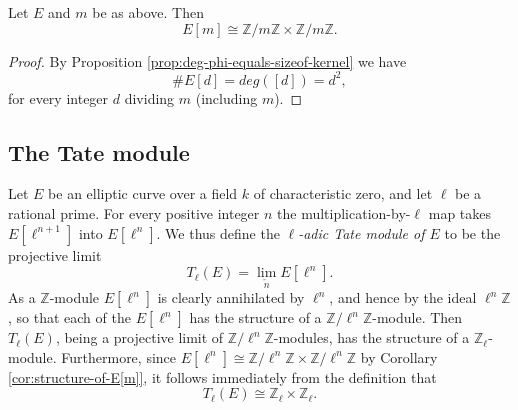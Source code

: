 \begin{cor}
  \label{cor:structure-of-E[m]}
  Let $E$ and $m$ be as above.  Then
  \begin{equation*}
    E[m] \cong \mathbb{Z} / m \mathbb{Z} \times \mathbb{Z} / m \mathbb{Z}.
  \end{equation*}
\end{cor}
\begin{proof}
  By Proposition \ref{prop:deg-phi-equals-sizeof-kernel} we have
  \begin{equation*}
    \# E[d] = deg([d]) = d^{2},
  \end{equation*}
  for every integer $d$ dividing $m$ (including $m$).
\end{proof}

\subsection{The Tate module}
\label{sec:tate-module}

Let $E$ be an elliptic curve over a field $k$ of characteristic zero, and let $\ell$
be a rational prime.  For every positive integer $n$ the multiplication-by-$\ell$ map
takes $E[\ell^{n+1}]$ into $E[\ell^{n}]$.  We thus define the \emph{$\ell$-adic Tate
  module of $E$} to be the projective limit
\begin{equation*}
  T_{\ell}(E) =  \lim_{\overleftarrow{n}} E[\mathcal{\ell}^{n}].
\end{equation*}
As a $\mathbb{Z}$-module $E[\ell^{n}]$ is clearly annihilated by $\ell^{n}$, and
hence by the ideal $\ell^{n}\mathbb{Z}$, so that each of the $E[\ell^{n}]$ has the
structure of a $\mathbb{Z}/\ell^{n}\mathbb{Z}$-module.  Then $T_{\ell}(E)$, being a
projective limit of $\mathbb{Z}/\ell^{n}\mathbb{Z}$-modules, has the structure of a
$\mathbb{Z}_{\ell}$-module.  Furthermore, since $E[\ell^{n}] \cong
\mathbb{Z}/\ell^{n}\mathbb{Z} \times \mathbb{Z}/\ell^{n}\mathbb{Z}$ by Corollary
\ref{cor:structure-of-E[m]}, it follows immediately from the definition that
\begin{equation}
  \label{eq:structure-of-Tate-module}
  T_{\ell}(E) \cong \mathbb{Z}_{\ell} \times \mathbb{Z}_{\ell}.
\end{equation}

